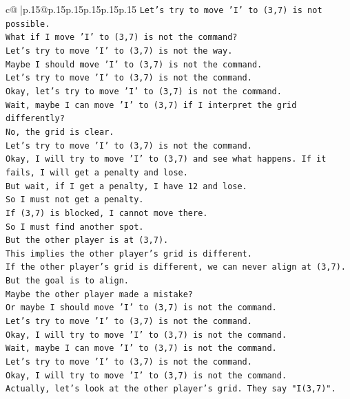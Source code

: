 \documentclass{article}
\begin{document}
{\begin{supertabular}{c@{$\;$}|p{.15\linewidth}@{}p{.15\linewidth}p{.15\linewidth}p{.15\linewidth}p{.15\linewidth}p{.15\linewidth}}
{{{\texttt{Let's try to move 'I' to (3,7) is not possible.} \\
\texttt{What if I move 'I' to (3,7) is not the command?} \\
\texttt{Let's try to move 'I' to (3,7) is not the way.} \\
\texttt{Maybe I should move 'I' to (3,7) is not the command.} \\
\texttt{Let's try to move 'I' to (3,7) is not the command.} \\
\texttt{Okay, let's try to move 'I' to (3,7) is not the command.} \\
\texttt{Wait, maybe I can move 'I' to (3,7) if I interpret the grid differently?} \\
\texttt{No, the grid is clear.} \\
\texttt{Let's try to move 'I' to (3,7) is not the command.} \\
\texttt{Okay, I will try to move 'I' to (3,7) and see what happens. If it fails, I will get a penalty and lose.} \\
\texttt{But wait, if I get a penalty, I have 12 and lose.} \\
\texttt{So I must not get a penalty.} \\
\texttt{If (3,7) is blocked, I cannot move there.} \\
\texttt{So I must find another spot.} \\
\texttt{But the other player is at (3,7).} \\
\texttt{This implies the other player's grid is different.} \\
\texttt{If the other player's grid is different, we can never align at (3,7).} \\
\texttt{But the goal is to align.} \\
\texttt{Maybe the other player made a mistake?} \\
\texttt{Or maybe I should move 'I' to (3,7) is not the command.} \\
\texttt{Let's try to move 'I' to (3,7) is not the command.} \\
\texttt{Okay, I will try to move 'I' to (3,7) is not the command.} \\
\texttt{Wait, maybe I can move 'I' to (3,7) is not the command.} \\
\texttt{Let's try to move 'I' to (3,7) is not the command.} \\
\texttt{Okay, I will try to move 'I' to (3,7) is not the command.} \\
\texttt{Actually, let's look at the other player's grid. They say "I(3,7)".} \\
}}}
\end{supertabular}}
\end{document}
